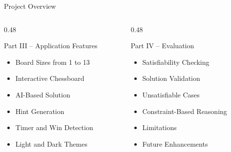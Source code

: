 \documentclass[aspectratio=169,12pt]{beamer}
\begin{document}

\begin{frame}{Project Overview}

\begin{columns}[T,totalwidth=\textwidth]

\begin{column}{0.48\textwidth}

\begin{block}{Part III -- Application Features}

\begin{itemize}
    \item Board Sizes from 1 to 13
    \item Interactive Chessboard
    \item AI-Based Solution
    \item Hint Generation
    \item Timer and Win Detection
    \item Light and Dark Themes
\end{itemize}

\end{block}

\end{column}

\begin{column}{0.48\textwidth}

\begin{block}{Part IV -- Evaluation}

\begin{itemize}
    \item Satisfiability Checking
    \item Solution Validation
    \item Unsatisfiable Cases
    \item Constraint-Based Reasoning
    \item Limitations
    \item Future Enhancements
\end{itemize}

\end{block}

\end{column}

\end{columns}

\end{frame}
\end{document}
